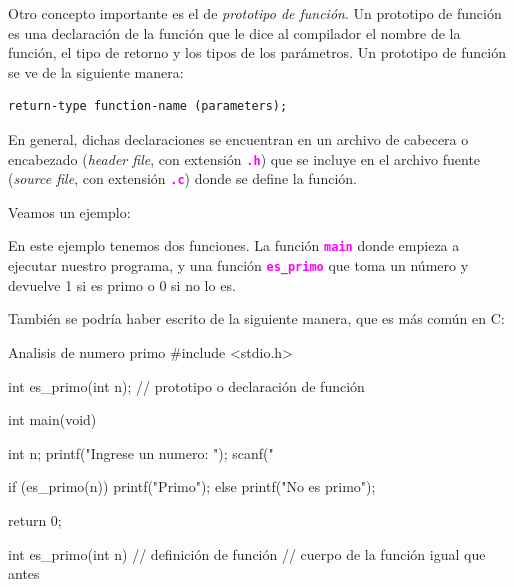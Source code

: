 \documentclass[]{scrartcl}
\newcommand{\hl}[1]{\textcolor{magenta}{\textbf{\texttt{#1}}}}
\begin{document}
Otro concepto importante es el de \textit{prototipo de función}. Un prototipo de función es una declaración de la función que le dice al compilador el nombre de la función, el tipo de retorno y los tipos de los parámetros. Un prototipo de función se ve de la siguiente manera:

\begin{center}
  \begin{Verbatim}[fontshape=it]
  return-type function-name (parameters);
  \end{Verbatim}
\end{center}

En general, dichas declaraciones se encuentran en un archivo de cabecera o encabezado (\textit{header file}, con extensión \hl{.h}) que se incluye en el archivo fuente (\textit{source file}, con extensión \hl{.c}) donde se define la función.

Veamos un ejemplo:

En este ejemplo tenemos dos funciones. La función \hl{main} donde empieza a ejecutar nuestro programa, y una función \hl{es\_primo} que toma un número y devuelve 1 si es primo o 0 si no lo es.

También se podría haber escrito de la siguiente manera, que es más común en C:

\begin{cbox}[]{Analisis de numero primo}
  #include <stdio.h>
  
  int es_primo(int n);    // prototipo o declaración de función

  int main(void) {
    int n;
    printf("Ingrese un numero: ");
    scanf("%
            
    if (es_primo(n)) {
      printf("Primo\n");
    } else {
      printf("No es primo\n");
    }
                
    return 0;
  }

  int es_primo(int n) {     // definición de función
    // cuerpo de la función igual que antes
  }

\end{cbox}
\end{document}
